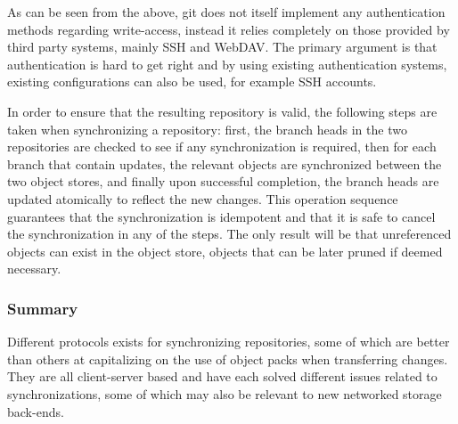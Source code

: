 As can be seen from the above, git does not itself implement any
authentication methods regarding write-access, instead it relies
completely on those provided by third party systems, mainly SSH and
WebDAV. The primary argument is that authentication is hard to get
right and by using existing authentication systems, existing
configurations can also be used, for example SSH accounts.

In order to ensure that the resulting repository is valid, the
following steps are taken when synchronizing a repository: first, the
branch heads in the two repositories are checked to see if any
synchronization is required, then for each branch that contain
updates, the relevant objects are synchronized between the two object
stores, and finally upon successful completion, the branch heads are
updated atomically to reflect the new changes. This operation sequence
guarantees that the synchronization is idempotent and that it is safe
to cancel the synchronization in any of the steps. The only result
will be that unreferenced objects can exist in the object store,
objects that can be later pruned if deemed necessary.


\subsubsection*{Summary}

Different protocols exists for synchronizing repositories, some of
which are better than others at capitalizing on the use of object
packs when transferring changes. They are all client-server based and
have each solved different issues related to synchronizations, some of
which may also be relevant to new networked storage back-ends.
